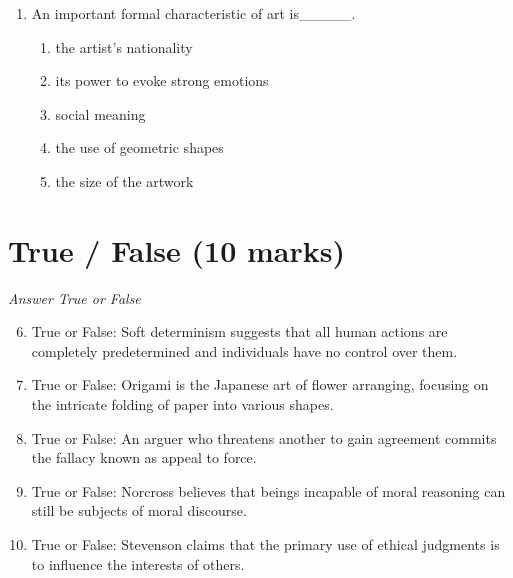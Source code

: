 \documentclass[12pt]{article}
\begin{document}
\begin{enumerate}[label=\arabic*.]
\begin{enumerate}[label=(\alph*)]
    \item provide an account of what makes right actions right.
    \item establish which things are good in themselves.
    \item develop a theory of good moral character.
    \item make ethical questions clear.
\end{enumerate}
\item An important formal characteristic of art is\_\_\_\_\_.
\begin{enumerate}[label=(\alph*)]
    \item the artist's nationality
    \item its power to evoke strong emotions
    \item social meaning
    \item the use of geometric shapes
    \item the size of the artwork
\end{enumerate}
\end{enumerate}

\section*{True / False (10 marks)}
\textit{Answer True or False}
\begin{enumerate}[label=\arabic*.]
\setcounter{enumi}{5}
\item True or False: Soft determinism suggests that all human actions are completely predetermined and individuals have no control over them.
\item True or False: Origami is the Japanese art of flower arranging, focusing on the intricate folding of paper into various shapes.
\item True or False: An arguer who threatens another to gain agreement commits the fallacy known as appeal to force.
\item True or False: Norcross believes that beings incapable of moral reasoning can still be subjects of moral discourse.
\item True or False: Stevenson claims that the primary use of ethical judgments is to influence the interests of others.
\end{enumerate}
\end{document}
